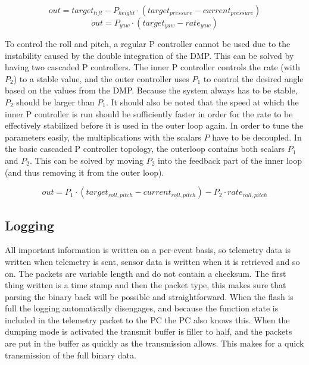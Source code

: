 \documentclass[final]{article}
\begin{document}
\begin{equation}
out = target_{lift} - P_{height} \cdot (target_{pressure} - current_{pressure})
\label{eq:control-height}
\end{equation}
\begin{equation}
out = P_{yaw} \cdot (target_{yaw} - rate_{yaw})
\label{eq:control-yaw}
\end{equation}

To control the roll and pitch, a regular P controller cannot be used due to the instability caused by the double integration of the DMP.
This can be solved by having two cascaded P controllers.
The inner P controller controls the rate (with $P_2$) to a stable value, and the outer controller uses $P_1$ to control the desired angle based on the values from the DMP.
Because the system always has to be stable, $P_2$ should be larger than $P_1$.
It should also be noted that the speed at which the inner P controller is run should be sufficiently faster in order for the rate to be effectively stabilized before it is used in the outer loop again.
In order to tune the parameters easily, the multiplications with the scalars $P$ have to be decoupled.
In the basic cascaded P controller topology, the outerloop contains both scalars $P_1$ and $P_2$.
This can be solved by moving $P_2$ into the feedback part of the inner loop (and thus removing it from the outer loop).

\begin{equation}
out = P_1 \cdot (target_{roll,pitch} - current_{roll,pitch}) - P_2 \cdot rate_{roll,pitch}
\label{eq:control-roll-pitch}
\end{equation}

\subsection{Logging}
All important information is written on a per-event basis, so telemetry data is written when telemetry is sent, sensor data is written when it is retrieved and so on.
The packets are variable length and do not contain a checksum.
The first thing written is a time stamp and then the packet type, this makes sure that parsing the binary back will be possible and straightforward.
When the flash is full the logging automatically disengages, and because the function state is included in the telemetry packet to the PC the PC also knows this.
When the dumping mode is activated the transmit buffer is filler to half, and the packets are put in the buffer as quickly as the transmission allows.
This makes for a quick transmission of the full binary data.
\end{document}
